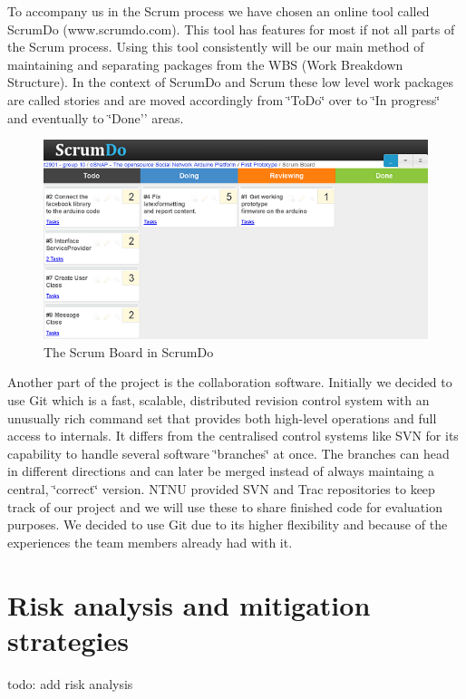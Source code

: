 To accompany us in the Scrum process we have chosen an online tool
called ScrumDo (www.scrumdo.com). This tool has features for most
if not all parts of the Scrum process. Using this tool consistently
will be our main method of maintaining and separating packages from
the WBS (Work Breakdown Structure). In the context of ScrumDo and
Scrum these low level work packages are called stories and are moved
accordingly from \char`\"{}ToDo\char`\"{} over to \char`\"{}In progress\char`\"{}
and eventually to \char`\"{}Done'' areas.
	
\begin{figure}[h!]
\centering \includegraphics{img/management-scrumdo} \caption{The Scrum Board in ScrumDo}

\label{fig:management-scrumdo}
\end{figure}
	
Another part of the project is the collaboration software.
Initially we decided to use Git which is a fast, scalable,
distributed revision control system with an unusually rich command
set that provides both high-level operations and full access to internals.
It differs from the centralised control systems like SVN for its capability
to handle several software \char`\"{}branches\char`\"{} at once. The
branches can head in different directions and can later be merged
instead of always maintaing a central, \char`\"{}correct\char`\"{}
version. NTNU provided SVN and Trac repositories to keep track of our
project and we will use these to share finished code for evaluation
purposes. We decided to use Git due to its higher flexibility and because
of the experiences the team members already had with it.

\section{Risk analysis and mitigation strategies}
todo: add risk analysis